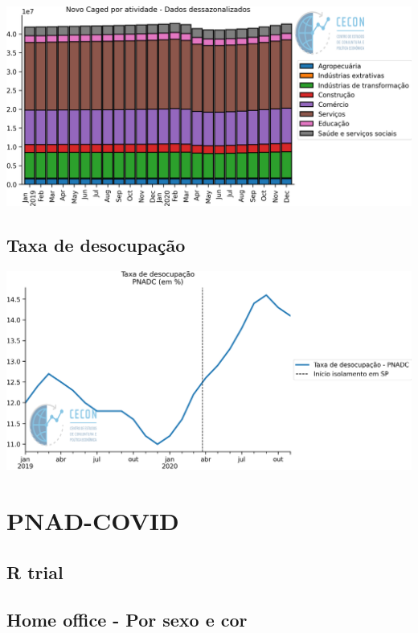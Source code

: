 \documentclass{SelfArx}
\begin{document}
\begin{center}
\includegraphics[width=.9\linewidth]{./figs/Emprego/NovoCaged_Atividade.png}
\end{center}



\subsection*{Taxa de desocupação}
\label{sec:orgcfafb82}

\begin{center}
\includegraphics[width=.9\linewidth]{./figs/Emprego/TaxaDesocupacao.png}
\end{center}

\section*{PNAD-COVID}
\label{sec:orgb871e0a}
\subsection*{R trial}
\label{sec:org48fb016}
\subsection*{Home office - Por sexo e cor}
\label{sec:org95b8afa}
\end{document}
